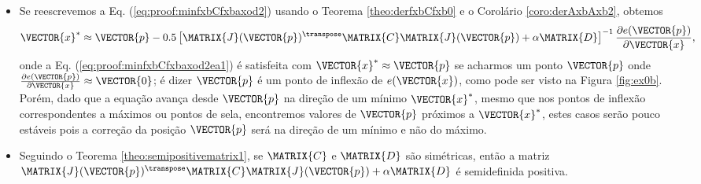 \begin{myproofT}
\begin{itemize}
\item Se reescrevemos a Eq. (\ref{eq:proof:minfxbCfxbaxod2}) usando o Teorema \ref{theo:derfxbCfxb0}
e o Corolário \ref{coro:derAxbAxb2},
obtemos
\begin{equation}\label{eq:proof:minfxbCfxbaxod2ea1}
\VECTOR{x}^* \approx \VECTOR{p} -
0.5 \left[ \MATRIX{J}(\VECTOR{p})^{\transpose}\MATRIX{C} \MATRIX{J}(\VECTOR{p})+\alpha \MATRIX{D} \right]^{-1}
\frac{\partial e(\VECTOR{p})}{\partial \VECTOR{x} },
\end{equation}
onde a Eq. (\ref{eq:proof:minfxbCfxbaxod2ea1}) é satisfeita 
com $\VECTOR{x}^* \approx \VECTOR{p}$
se acharmos um  ponto $\VECTOR{p}$ onde  
$\frac{\partial e(\VECTOR{p})}{\partial \VECTOR{x} }\approx \VECTOR{0}$; 
é dizer $\VECTOR{p}$ é um ponto de inflexão de $e(\VECTOR{x})$, como pode ser visto na Figura \ref{fig:ex0b}.
Porém, dado que a equação avança desde $\VECTOR{p}$ na direção de um mínimo $\VECTOR{x}^*$, 
mesmo que nos pontos de inflexão correspondentes a máximos ou pontos de sela,
encontremos valores de $\VECTOR{p}$ próximos a $\VECTOR{x}^*$,
 estes casos serão pouco estáveis pois
a correção da posição $\VECTOR{p}$ será na direção de um mínimo e não do máximo.
\item Seguindo o Teorema \ref{theo:semipositivematrix1}, se $\MATRIX{C}$ e $\MATRIX{D}$ são simétricas, 
então a matriz $\MATRIX{J}(\VECTOR{p})^{\transpose}\MATRIX{C} \MATRIX{J}(\VECTOR{p})+\alpha \MATRIX{D}$
é semidefinida positiva.


\end{itemize}
\end{myproofT}

